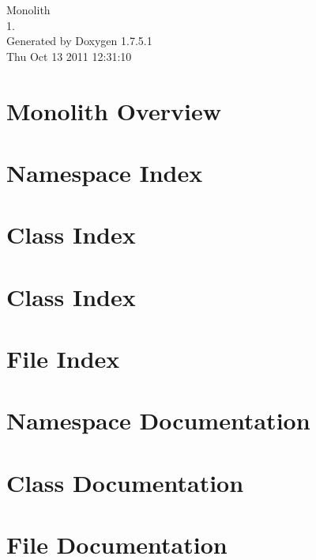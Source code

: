 \documentclass[a4paper]{book}
\begin{document}
\begin{titlepage}
\vspace*{7cm}
\begin{center}
{\Large \-Monolith \\[1ex]\large 1. }\\
\vspace*{1cm}
{\large \-Generated by Doxygen 1.7.5.1}\\
\vspace*{0.5cm}
{\small Thu Oct 13 2011 12:31:10}\\
\end{center}
\end{titlepage}
\clearemptydoublepage
{}
\tableofcontents
\clearemptydoublepage
{}
\chapter{\-Monolith \-Overview}
\label{index}
\chapter{\-Namespace \-Index}

\chapter{\-Class \-Index}

\chapter{\-Class \-Index}

\chapter{\-File \-Index}

\chapter{\-Namespace \-Documentation}

\chapter{\-Class \-Documentation}










\chapter{\-File \-Documentation}


















\printindex
\end{document}
